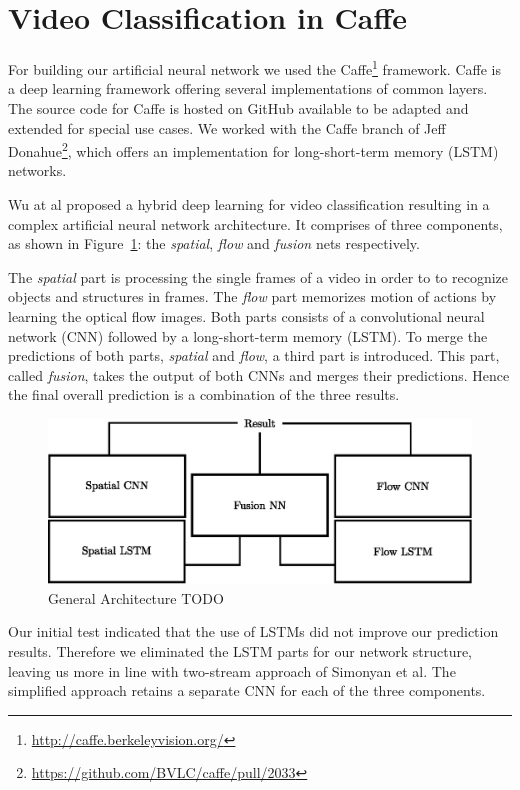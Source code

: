 \section{Video Classification in Caffe}
\label{sec:classification}

For building our artificial neural network we used the  Caffe\footnote{\url{http://caffe.berkeleyvision.org/}} framework.
Caffe is a deep learning framework offering several implementations of common layers.
The source code for Caffe is hosted on GitHub available to be adapted and extended for special use cases.
We worked with the Caffe branch of Jeff Donahue\footnote{\url{https://github.com/BVLC/caffe/pull/2033}}, which offers an implementation for long-short-term memory (LSTM) networks.

Wu at al \cite{wu2015modeling} proposed a hybrid deep learning for video classification resulting in a complex artificial neural network architecture.
It comprises of three components, as shown in Figure~\ref{fig:architecture}: the \emph{spatial}, \emph{flow} and \emph{fusion} nets respectively.

The \emph{spatial} part is processing the single frames of a video in order to to recognize objects and structures in frames.
The \emph{flow} part memorizes motion of actions by learning the optical flow images.
Both parts consists of a convolutional neural network (CNN) followed by a long-short-term memory (LSTM).
To merge the predictions of both parts, \emph{spatial} and \emph{flow}, a third part is introduced.
This part, called \emph{fusion}, takes the output of both CNNs and merges their predictions.
Hence the final overall prediction is a combination of the three results.

\begin{figure}[!htb]
	\centering
	\includegraphics[scale=.7]{images/architecture.eps}
	\caption{General Architecture TODO}
	\label{fig:architecture}
\end{figure}

Our initial test indicated that the use of LSTMs did not improve our prediction results. 
Therefore we eliminated the LSTM parts for our network structure, leaving us more in line with two-stream approach of Simonyan et al\cite{simonyan2014two}.
The simplified approach retains a separate CNN for each of the three components.

